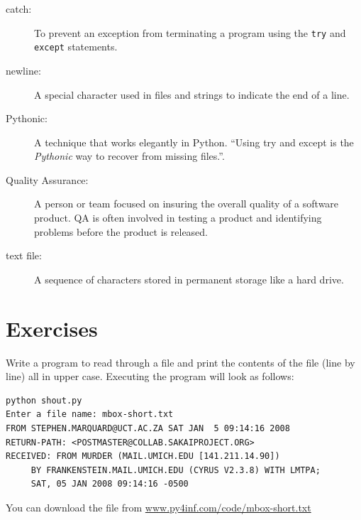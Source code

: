 \documentclass[10pt]{book}
\begin{document}
\begin{description}

\item[catch:] To prevent an exception from terminating
a program using the {\tt try}
and {\tt except} statements.

\item[newline:] A special character used in files and strings to indicate
the end of a line.

\item[Pythonic:] A technique that works elegantly in Python.
``Using try and except is the \emph{Pythonic} way to recover from 
missing files.''.

\item[Quality Assurance:] A person or team focused on insuring the 
overall quality of a software product.  QA is often involved 
in testing a product and identifying problems before the product 
is released.

\item[text file:] A sequence of characters stored in permanent
storage like a hard drive.

\end{description}


\section{Exercises}

\begin{ex}
Write a program to read through a file and print the contents 
of the file (line by line) all in upper case.  Executing the program 
will look as follows:

\beforeverb
\begin{verbatim}
python shout.py
Enter a file name: mbox-short.txt
FROM STEPHEN.MARQUARD@UCT.AC.ZA SAT JAN  5 09:14:16 2008
RETURN-PATH: <POSTMASTER@COLLAB.SAKAIPROJECT.ORG>
RECEIVED: FROM MURDER (MAIL.UMICH.EDU [141.211.14.90])
	 BY FRANKENSTEIN.MAIL.UMICH.EDU (CYRUS V2.3.8) WITH LMTPA;
	 SAT, 05 JAN 2008 09:14:16 -0500
\end{verbatim}
\afterverb
%
You can download the file from
\url{www.py4inf.com/code/mbox-short.txt}
\end{ex}
\end{document}
